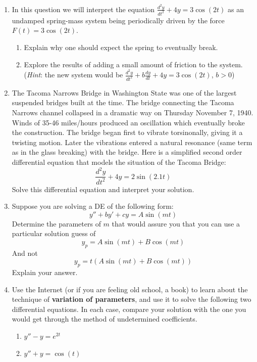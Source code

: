 \begin{enumerate}
\clearpage

\item In this question we will interpret the equation $\displaystyle\frac{d^2y}{dt^2} + 4y = 3\cos(2t)$ as an undamped spring-mass system being periodically driven by the force $F(t) = 3\cos(2t)$. \label{07HWproblem6}
\begin{enumerate}
\item Explain why one should expect the spring to eventually break. \label{07HWproblem6parta}
\item Explore the results of adding a small amount of friction to the system. (\textit{Hint}: the new system would be $\displaystyle\frac{d^2y}{dt^2} + b\frac{dy}{dt} + 4y = 3\cos(2t)$, $b>0$) \label{07HWproblem6partb}
\end{enumerate}

\item The Tacoma Narrows Bridge in Washington State was one of the largest suspended bridges built at the time. The bridge connecting the Tacoma Narrows channel collapsed in a dramatic way on Thursday November 7, 1940. Winds of 35-46 miles/hours produced an oscillation which eventually broke the construction. The bridge began first to vibrate torsinonally, giving it a twisting motion. Later the vibrations entered a natural resonance (same term as in the glass breaking) with the bridge. Here is a simplified second order differential equation that models the situation of the Tacoma Bridge: \label{07HWproblem7}
\[
\frac{d^2y}{dt^2}+4y=2\sin(2.1t)
\]
Solve this differential equation and interpret your solution.

\item Suppose you are solving a DE of the following form: \label{07HWproblem8}
\[
y''+by'+cy=A\sin(mt)
\]
Determine the parameters of $m$ that would assure you that you can use a particular solution guess of
\[
y_p=A\sin(mt)+B\cos(mt)
\]
And not
\[
y_p=t(A\sin(mt)+B\cos(mt))
\]
Explain your answer.

\item Use the Internet (or if you are feeling old school, a book) to learn about the technique of \textbf{variation of parameters}, and use it to solve the following two differential equations. In each case, compare your solution with the one you would get through the method of undetermined coefficients. \label{07HWproblem9}
\begin{enumerate}
\item $y'' - y = e^{2t}$
\item $y'' + y = \cos(t)$
\end{enumerate}


\end{enumerate}





